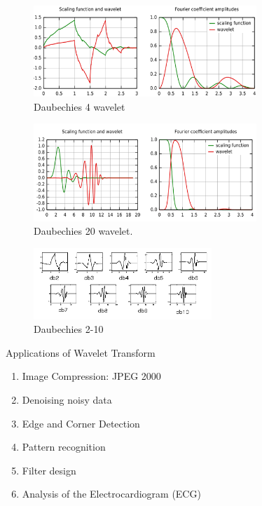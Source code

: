\documentclass[12pt, a4paper, twoside]{report}
\begin{document}
\begin{figure}[!h]
	\centering
	\includegraphics[width=0.75\textwidth]
	{images/chapter3/daubechies-4}
	\caption{Daubechies 4 wavelet}
	\label{fig:daubechies-4}
\end{figure}
\begin{figure}[!h]
	\centering
	\includegraphics[width=0.75\textwidth]
	{images/chapter3/daubechies-20}
	\caption{Daubechies 20 wavelet.}
	\label{fig:daubechies-20}
\end{figure}
\begin{figure}[!h]
	\centering
	\includegraphics[width=0.6\textwidth]
	{images/chapter3/daubechies-1-10}
	\caption{Daubechies 2-10}
	\label{fig:daubechies-1-10}
\end{figure}

Applications of Wavelet Transform
\begin{enumerate}
\item Image Compression: JPEG 2000
\item Denoising noisy data
\item Edge and Corner Detection
\item Pattern recognition
\item Filter design
\item Analysis of the Electrocardiogram (ECG)
\end{enumerate}
\end{document}
